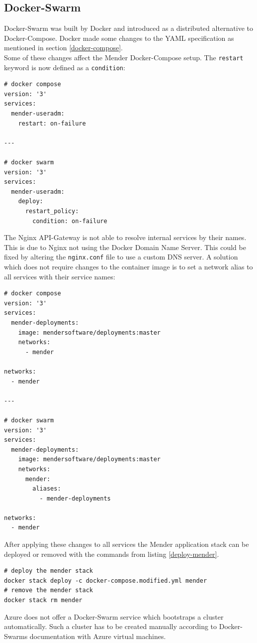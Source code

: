 \subsection{Docker-Swarm}
Docker-Swarm was built by Docker and introduced as a distributed alternative to Docker-Compose. Docker made some changes to the YAML specification as mentioned in section \ref{docker-compose}.\\
Some of these changes affect the Mender Docker-Compose setup. The \verb|restart| keyword is now defined as a \verb|condition|:
\begin{code}
  \begin{verbatim}
# docker compose
version: '3'
services:
  mender-useradm:
    restart: on-failure

---

# docker swarm
version: '3'
services:
  mender-useradm:
    deploy:
      restart_policy:
        condition: on-failure
  \end{verbatim}
\end{code}
The Nginx API-Gateway is not able to resolve internal services by their names. This is due to Nginx not using the Docker Domain Name Server. This could be fixed by altering the \verb|nginx.conf| file to use a custom DNS server. A solution which does not require changes to the container image is to set a network alias to all services with their service names:
\begin{code}
  \begin{verbatim}
# docker compose
version: '3'
services:
  mender-deployments:
    image: mendersoftware/deployments:master
    networks:
      - mender

networks:
  - mender

---

# docker swarm
version: '3'
services:
  mender-deployments:
    image: mendersoftware/deployments:master
    networks:
      mender:
        aliases:
          - mender-deployments

networks:
  - mender
  \end{verbatim}
\end{code}
After applying these changes to all services the Mender application stack can be deployed or removed with the commands from listing \ref{deploy-mender}.
\begin{code}
  \label{deploy-mender}
  \begin{verbatim}
# deploy the mender stack
docker stack deploy -c docker-compose.modified.yml mender
# remove the mender stack
docker stack rm mender
  \end{verbatim}
\end{code}
Azure does not offer a Docker-Swarm service which bootstraps a cluster automatically. Such a cluster has to be created manually according to Docker-Swarms documentation with Azure virtual machines.

